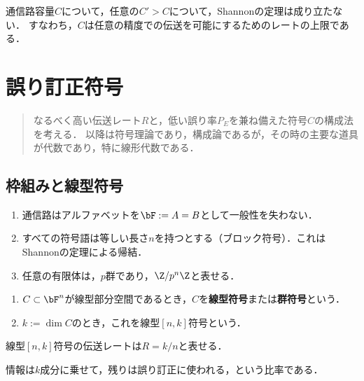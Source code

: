\documentclass[uplatex,dvipdfmx]{jsreport}
\begin{document}
\begin{corollary}
    通信路容量$C$について，任意の$C'>C$について，Shannonの定理は成り立たない．
    すなわち，$C$は任意の精度での伝送を可能にするためのレートの上限である．
\end{corollary}

\chapter{誤り訂正符号}

\begin{quotation}
    なるべく高い伝送レート$R$と，低い誤り率$P_E$を兼ね備えた符号$C$の構成法を考える．
    以降は符号理論であり，構成論であるが，その時の主要な道具が代数であり，特に線形代数である．
\end{quotation}

\section{枠組みと線型符号}

\begin{notation}\mbox{}
    \begin{enumerate}
        \item 通信路はアルファベットを$\bF:=A=B$として一般性を失わない．
        \item すべての符号語は等しい長さ$n$を持つとする（ブロック符号）．これはShannonの定理による帰結．
        \item 任意の有限体は，$p$群であり，$\Z/p^n\Z$と表せる．
    \end{enumerate}
\end{notation}

\begin{definition}\mbox{}
    \begin{enumerate}
        \item $C\subset\bF^n$が線型部分空間であるとき，$C$を\textbf{線型符号}または\textbf{群符号}という．
        \item $k:=\dim C$のとき，これを線型$[n,k]$符号という．
    \end{enumerate}
\end{definition}

\begin{lemma}
    線型$[n,k]$符号の伝送レートは$R=k/n$と表せる．
\end{lemma}
\begin{remarks}
    情報は$k$成分に乗せて，残りは誤り訂正に使われる，という比率である．
\end{remarks}
\end{document}
